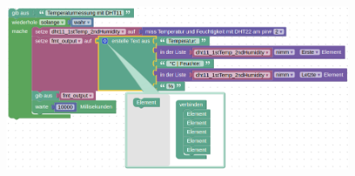 \hspace{20mm}

\begin{figure}[ht]
	\includegraphics[scale=0.44]{images/Blockly-gPIo_DHT11_DE.png}	
	\label{Blockly-gPIo_DHT11_DE}
\end{figure}

